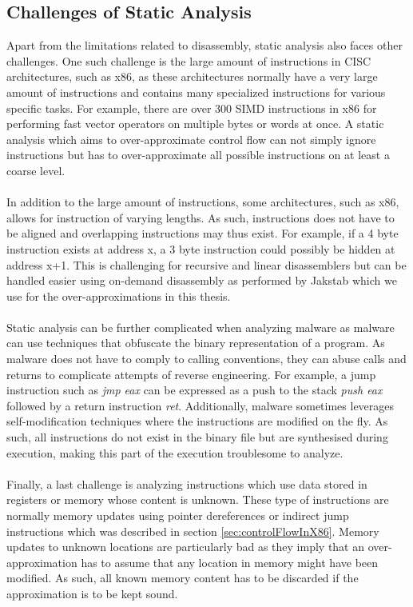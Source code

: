 \documentclass{kththesis}
\newcommand{\fbcomment}[1]{{#1}}
\renewcommand{\fbcomment}[1]{}
\renewcommand{\it}[1]{\textit{#1}}
\begin{document}
\subsection{Challenges of Static Analysis}
\fbcomment{\color{red}Goal: Describe what makes static analysis difficult(For example, instructions of varying sizes).}
Apart from the limitations related to disassembly, static analysis also faces other challenges. One such challenge is the large amount of instructions in CISC architectures, such as x86, as these architectures normally have a very large amount of instructions and contains many specialized instructions for various specific tasks\cite{intelX86Manual}. For example, there are over 300 SIMD instructions in x86 for performing fast vector operators on multiple bytes or words at once\cite{vectorInstructions}. A static analysis which aims to over-approximate control flow can not simply ignore instructions but has to over-approximate all possible instructions on at least a coarse level. 
\\ \\
In addition to the large amount of instructions, some architectures, such as x86, allows for instruction of varying lengths. As such, instructions does not have to be aligned and overlapping instructions may thus exist. For example, if a 4 byte instruction exists at address x, a 3 byte instruction could possibly be hidden at address x+1. This is challenging for recursive and linear disassemblers but can be handled easier using on-demand disassembly as performed by Jakstab which we use for the over-approximations in this thesis. 
\\ \\
Static analysis can be further complicated when analyzing malware as malware can use techniques that obfuscate the binary representation of a program\cite{StaticDisAndCodeAnal}. As malware does not have to comply to calling conventions, they can abuse calls and returns to complicate attempts of reverse engineering. For example, a jump instruction such as \it{jmp eax} can be expressed as a push to the stack \it{push eax} followed by a return instruction \it{ret}. Additionally, malware sometimes leverages self-modification techniques where the instructions are modified on the fly. As such, all instructions do not exist in the binary file but are synthesised during execution, making this part of the execution troublesome to analyze.
\\ \\
Finally, a last challenge is analyzing instructions which use data stored in registers or memory whose content is unknown. These type of instructions are normally memory updates using pointer dereferences or indirect jump instructions which was described in section \ref{sec:controlFlowInX86}\cite{Jakstab}. Memory updates to unknown locations are particularly bad as they imply that an over-approximation has to assume that any location in memory might have been modified. As such, all known memory content has to be discarded if the approximation is to be kept sound.
\end{document}

